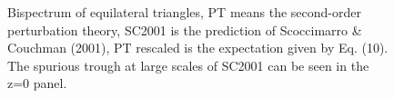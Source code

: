 \documentclass[]{mn2e}
\begin{document}
\begin{figure}
\caption{Bispectrum of equilateral triangles, PT means the
second-order perturbation theory, SC2001 is the prediction of
Scoccimarro \& Couchman (2001), PT rescaled is the expectation given
by Eq. (10). The spurious trough at large scales of SC2001 can be
seen in the z=0 panel.}
\end{figure}
\end{document}
